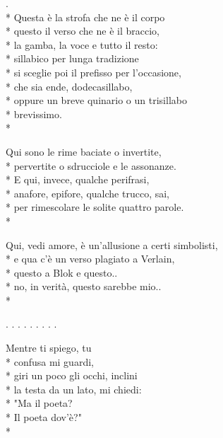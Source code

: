 \documentclass[12pt]{book}
\begin{document}
\begin{poem}{}{}

\settowidth{\versewidth}{non meno è ciò che meriti.}

\begin{altverse}
.\\*
Questa è la strofa che ne è il corpo \\*
questo il verso che ne è il braccio, \\*
la gamba, la voce e tutto il resto: \\*
sillabico per lunga tradizione \\*
si sceglie poi il prefisso per l'occasione, \\*
che sia ende, dodecasillabo, \\*
oppure un breve quinario o un trisillabo \\*
brevissimo. \\* 
\end{altverse}

\begin{altverse}
Qui sono le rime baciate o invertite, \\*
pervertite o sdrucciole e le assonanze. \\*
E qui, invece, qualche perifrasi, \\*
anafore, epifore, qualche trucco, sai, \\*
per rimescolare le solite quattro parole. \\*
\end{altverse}

\begin{altverse}
Qui, vedi amore, è un'allusione a certi simbolisti, \\*
e qua c'è un verso plagiato a Verlain, \\*
questo a Blok e questo.. \\*
no, in verità, questo sarebbe mio.. \\* 
\end{altverse}

. . . . . . . . .

\begin{altverse}
Mentre ti spiego, tu \\*
confusa mi guardi, \\*
giri un poco gli occhi, inclini \\*
la testa da un lato, mi chiedi: \\*
"Ma il poeta? \\*
Il poeta dov'è?" \\*
\end{altverse}


\end{poem}
\end{document}
